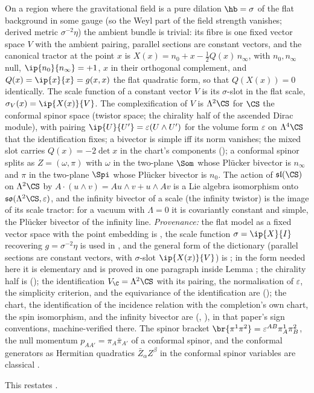 On a region where the gravitational field is a pure dilation $\hb = \sigma$ of the flat background in some gauge (so the Weyl part of the field strength vanishes; derived metric $\sigma^{-2}\eta$) the ambient bundle is trivial: its fibre is one fixed vector space $V$ with the ambient pairing, parallel sections are constant vectors, and the canonical tractor at the point $x$ is $X(x) = n_{0} + x - \tfrac12 Q(x)\, n_{\infty}$, with $n_{0}, n_{\infty}$ null, $\ip{n_{0}}{n_{\infty}} = +1$, $x$ in their orthogonal complement, and $Q(x) = \ip{x}{x} = g(x,x)$ the flat quadratic form, so that $Q(X(x)) = 0$ identically. The scale function of a constant vector $V$ is its $\sigma$-slot in the flat scale, $\sigma_{V}(x) = \ip{X(x)}{V}$. The complexification of $V$ is $\Lambda^{2}\CS$ for $\CS$ the conformal spinor space (twistor space; the chirality half of the ascended Dirac module), with pairing $\ip{U}{U'} = \varepsilon(U \wedge U')$ for the volume form $\varepsilon$ on $\Lambda^{4}\CS$ that the identification fixes; a bivector is simple iff its norm vanishes; the mixed slot carries $Q(x) = -2\det x$ in the chart's components \cite[Thm.~4.2(2)]{ButlerT9} (); a conformal spinor splits as $Z = (\omega, \pi)$ with $\omega$ in the two-plane $\Som$ whose Pl\"ucker bivector is $n_{\infty}$ and $\pi$ in the two-plane $\Spi$ whose Pl\"ucker bivector is $n_{0}$. The action of $\mathfrak{sl}(\CS)$ on $\Lambda^{2}\CS$ by $A\cdot(u \wedge v) = Au \wedge v + u \wedge Av$ is a Lie algebra isomorphism onto $\mathfrak{so}(\Lambda^{2}\CS, \varepsilon)$, and the infinity bivector of a scale (the infinity twistor) is the image of its scale tractor: for a vacuum with $\Lambda = 0$ it is covariantly constant and simple, the Pl\"ucker bivector of the infinity line. \emph{Provenance:} the flat model as a fixed vector space with the point embedding is \cite[\S4.2]{ButlerT6}, the scale function $\sigma = \ip{X}{I}$ recovering $g = \sigma^{-2}\eta$ is used in \cite[Lem.~4.8]{ButlerT6}, and the general form of the dictionary (parallel sections are constant vectors, with $\sigma$-slot $\ip{X(x)}{V}$) is \cite[\S2]{BEG1994}; in the form needed here it is elementary and is proved in one paragraph inside Lemma ; the chirality half is \cite[Thm.~3.1]{ButlerT9} (); the identification $V_{\C} = \Lambda^{2}\CS$ with its pairing, the normalisation of $\varepsilon$, the simplicity criterion, and the equivariance of the identification are \cite[Thm.~3.4]{ButlerT9} (); the chart, the identification of the incidence relation with the completion's own chart, the spin isomorphism, and the infinity bivector are \cite[Thm.~4.2, Cor.~4.8, Prop.~5.2]{ButlerT9} (, ), in that paper's sign conventions, machine-verified there. The spinor bracket $\br{\pi^{1}\pi^{2}} = \varepsilon^{AB}\pi^{1}_{A}\pi^{2}_{B}$, the null momentum $p_{AA'} = \pi_{A}\bar\pi_{A'}$ of a conformal spinor, and the conformal generators as Hermitian quadratics $\bar{Z}_{\alpha}Z^{\beta}$ in the conformal spinor variables are classical \cite{PenroseRindler1986, Hughston1979}.

This restates .
